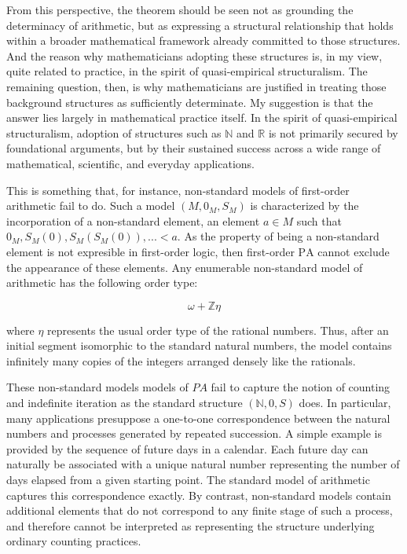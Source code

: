 \documentclass[11pt,a4paper]{book}
\theoremstyle{plain}
\begin{document}
From this perspective, the theorem should be seen not as grounding the determinacy of arithmetic, but as expressing a structural relationship that holds within a broader mathematical framework already committed to those structures. And the reason why mathematicians adopting these structures is, in my view, quite related to practice, in the spirit of quasi-empirical structuralism. The remaining question, then, is why mathematicians are justified in treating those background structures as sufficiently determinate. My suggestion is that the answer lies largely in mathematical practice itself. In the spirit of quasi-empirical structuralism, adoption of structures such as $\mathbb{N}$ and $\mathbb{R}$ is not primarily secured by foundational arguments, but by their sustained success across a wide range of mathematical, scientific, and everyday applications.

This is something that, for instance, non-standard models of first-order arithmetic fail to do. Such a model $(M, 0_M, S_M)$ is characterized by the incorporation of a non-standard element, an element $a\in M$ such that $0_M, S_M(0), S_M(S_M(0)),... < a$. As the property of being a non-standard element is not expresible in first-order logic, then first-order $\mathrm{PA}$ cannot exclude the appearance of these elements. Any enumerable non-standard model of arithmetic has the following order type:

$$\omega+ \mathbb{Z} \eta$$ 

where $\eta$ represents the usual order type of the rational numbers. Thus, after an initial segment isomorphic to the standard natural numbers, the model contains infinitely many copies of the integers arranged densely like the rationals.

These non-standard models models of $PA$ fail to capture the notion of counting and indefinite iteration as the standard structure $(\mathbb{N},0,S)$ does. In particular, many applications presuppose a one-to-one correspondence between the natural numbers and processes generated by repeated succession. A simple example is provided by the sequence of future days in a calendar. Each future day can naturally be associated with a unique natural number representing the number of days elapsed from a given starting point. The standard model of arithmetic captures this correspondence exactly. By contrast, non-standard models contain additional elements that do not correspond to any finite stage of such a process, and therefore cannot be interpreted as representing the structure underlying ordinary counting practices.
\end{document}
